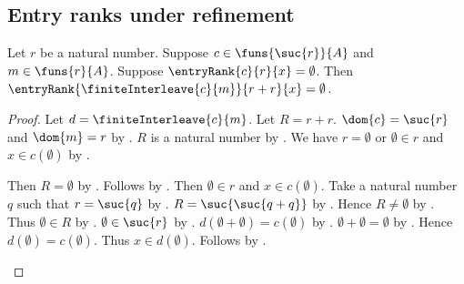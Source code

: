 \subsection{Entry ranks under refinement}

\begin{proposition}\label{entry_rank_interleave_zero}
    Let $r$ be a natural number.
    Suppose $c\in\funs{\suc{r}}{A}$ and $m\in\funs{r}{A}$.
    Suppose $\entryRank{c}{r}{x}=\emptyset$.
    Then
        $\entryRank{\finiteInterleave{c}{m}}{r+r}{x}=\emptyset$.
\end{proposition}
\begin{proof}
    Let $d=\finiteInterleave{c}{m}$.
    Let $R=r+r$.
    $\dom{c}=\suc{r}$ and $\dom{m}=r$ by .
    $R$ is a natural number by .
    We have $r=\emptyset$ or
        $\emptyset\in r$ and $x\in c(\emptyset)$
        by .
    \begin{byCase}
        Then $R=\emptyset$ by .
        Follows by .
        Then $\emptyset\in r$ and $x\in c(\emptyset)$.
        Take a natural number $q$ such that $r=\suc{q}$
            by .
        $R=\suc{\suc{q+q}}$
            by .
        Hence $R\neq\emptyset$ by .
        Thus $\emptyset\in R$
            by .
        $\emptyset\in\suc{r}$
            by .
        $d(\emptyset+\emptyset)=c(\emptyset)$
            by .
        $\emptyset+\emptyset=\emptyset$
            by .
        Hence $d(\emptyset)=c(\emptyset)$.
        Thus $x\in d(\emptyset)$.
        Follows by .
    \end{byCase}
\end{proof}

